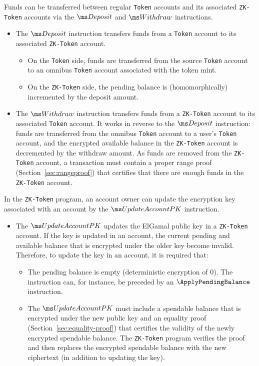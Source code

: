 \noindent
Funds can be transferred between regular \texttt{Token} accounts and its
associated \texttt{ZK-Token} accounts via the $\Deposit$ and $\Withdraw$
instructions.
\begin{itemize}
  \item The $\Deposit$ instruction transfers funds from a \texttt{Token} account
    to its associated \texttt{ZK-Token} account. 
    \begin{itemize}
      \item On the \texttt{Token} side, funds are transferred from
        the source \texttt{Token} account to an omnibus \texttt{Token} account
        associated with the token mint.
      \item On the \texttt{ZK-Token} side, the pending balance is
        (homomorphically) incremented by the deposit amount.
    \end{itemize}

  \item The $\Withdraw$ instruction transfers funds from a \texttt{ZK-Token}
    account to its associated \texttt{Token} account. It works in reverse to the
    $\Deposit$ instruction: funds are transferred from the omnibus
    \texttt{Token} account to a user's \texttt{Token} account, and the encrypted
    available balance in the \texttt{ZK-Token} account is decremented by the
    withdraw amount. As funds are removed from the \texttt{ZK-Token} account, a
    transaction must contain a proper range proof (Section~\ref{sec:rangeproof})
    that certifies that there are enough funds in the \texttt{ZK-Token} account.
\end{itemize}

\noindent
In the \texttt{ZK-Token} program, an account owner can update the
encryption key associated with an account by the $\UpdateAccountPK$ instruction.

\begin{itemize}
  \item The $\UpdateAccountPK$ updates the ElGamal public key in a
    \texttt{ZK-Token} account. If the key is updated in an account, the current
    pending and available balance that is encrypted under the older key become
    invalid. Therefore, to update the key in an account, it is required that:
    \begin{itemize}
      \item The pending balance is empty (deterministic encryption of 0).
        The instruction can, for instance, be preceded by an
        $\ApplyPendingBalance$ instruction.

      \item The $\UpdateAccountPK$ must include a spendable balance that is
        encrypted under the new public key and an equality proof
        (Section~\ref{sec:equality-proof}) that certifies the validity of the
        newly encrypted spendable balance. The \texttt{ZK-Token} program verifies
        the proof and then replaces the encrypted spendable balance with the
        new ciphertext (in addition to updating the key).

    \end{itemize}
\end{itemize}


